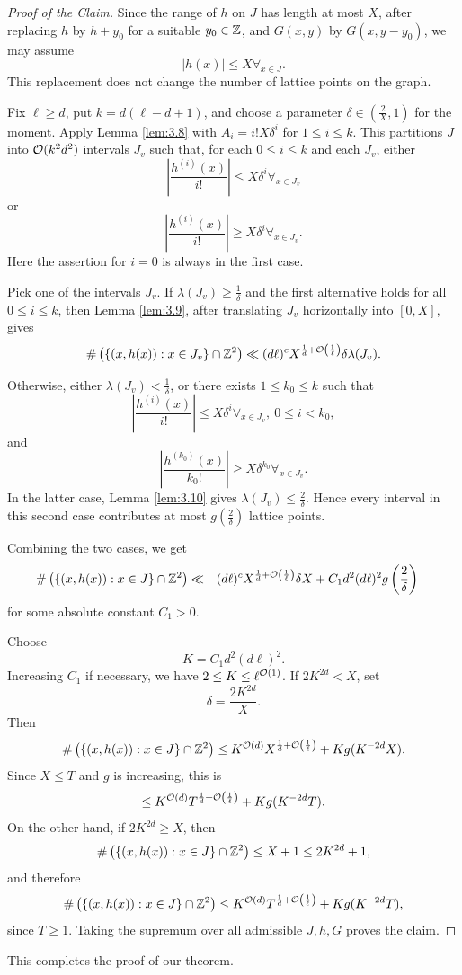 \documentclass{Vorlesungstemplate_English} %
\begin{document}
\begin{pf}
\begin{proof}[Proof of the Claim]
    Since the range of $h$ on $J$ has length at most $X$, after replacing $h$ by $h+y_0$ for a suitable $y_0 \in \mathbb{Z}$, and $G(x,y)$ by $G(x,y-y_0)$, we may assume
    \[ |h(x)| \leq X \forall_{x \in J}.\]
    This replacement does not change the number of lattice points on the graph.

    Fix $\ell \geq d$, put $k=d(\ell-d+1)$, and choose a parameter $\delta \in \left(\frac{2}{X},1\right)$ for the moment. Apply Lemma \ref{lem:3.8} with $A_i=i!X\delta^i$ for $1 \leq i \leq k$. This partitions $J$ into $\mathcal{O}(k^2d^2)$ intervals $J_v$ such that, for each $0 \leq i \leq k$ and each $J_v$, either
    \[ \left|\frac{h^{(i)}(x)}{i!}\right| \leq X\delta^i \forall_{x \in J_v}\]
    or
    \[ \left|\frac{h^{(i)}(x)}{i!}\right| \geq X\delta^i \forall_{x \in J_v}.\]
    Here the assertion for $i=0$ is always in the first case.

    Pick one of the intervals $J_v$. If $\lambda(J_v)\geq \frac{1}{\delta}$ and the first alternative holds for all $0 \leq i \leq k$, then Lemma \ref{lem:3.9}, after translating $J_v$ horizontally into $[0,X]$, gives
    \[ \#\left(\{(x,h(x)):x\in J_v\}\cap\mathbb{Z}^2\right) \ll (d\ell)^cX^{\frac{1}{d}+\mathcal{O}\left(\frac{1}{\ell}\right)}\delta\lambda(J_v).\]

    Otherwise, either $\lambda(J_v)<\frac{1}{\delta}$, or there exists $1 \leq k_0 \leq k$ such that
    \[ \left|\frac{h^{(i)}(x)}{i!}\right| \leq X\delta^i \forall_{x \in J_v}, \ 0 \leq i < k_0,\]
    and
    \[ \left|\frac{h^{(k_0)}(x)}{k_0!}\right| \geq X\delta^{k_0}\forall_{x \in J_v}.\]
    In the latter case, Lemma \ref{lem:3.10} gives $\lambda(J_v)\leq \frac{2}{\delta}$. Hence every interval in this second case contributes at most $g\left(\frac{2}{\delta}\right)$ lattice points.

    Combining the two cases, we get
    \begin{align*}
      \#\left(\{(x,h(x)):x\in J\}\cap\mathbb{Z}^2\right)
      \ll \quad & (d\ell)^cX^{\frac{1}{d}+\mathcal{O}\left(\frac{1}{\ell}\right)}\delta X
      + C_1d^2(d\ell)^2g\left(\frac{2}{\delta}\right)
    \end{align*}
    for some absolute constant $C_1>0$.

    Choose
    \[ K=C_1d^2(d\ell)^2.\]
    Increasing $C_1$ if necessary, we have $2 \leq K \leq \ell^{\mathcal{O}(1)}$. If $2K^{2d}<X$, set
    \[ \delta=\frac{2K^{2d}}{X}.\]
    Then
    \[ \#\left(\{(x,h(x)):x\in J\}\cap\mathbb{Z}^2\right)
      \leq K^{\mathcal{O}(d)}X^{\frac{1}{d}+\mathcal{O}\left(\frac{1}{\ell}\right)} + Kg(K^{-2d}X).\]
    Since $X \leq T$ and $g$ is increasing, this is
    \[ \leq K^{\mathcal{O}(d)}T^{\frac{1}{d}+\mathcal{O}\left(\frac{1}{\ell}\right)} + Kg(K^{-2d}T).\]
    On the other hand, if $2K^{2d}\geq X$, then
    \[ \#\left(\{(x,h(x)):x\in J\}\cap\mathbb{Z}^2\right) \leq X+1 \leq 2K^{2d}+1,\]
    and therefore
    \[ \#\left(\{(x,h(x)):x\in J\}\cap\mathbb{Z}^2\right)
      \leq K^{\mathcal{O}(d)}T^{\frac{1}{d}+\mathcal{O}\left(\frac{1}{\ell}\right)} + Kg(K^{-2d}T),\]
    since $T \geq 1$. Taking the supremum over all admissible $J,h,G$ proves the claim.
    \end{proof}
    This completes the proof of our theorem.
\end{pf}
\end{document}
